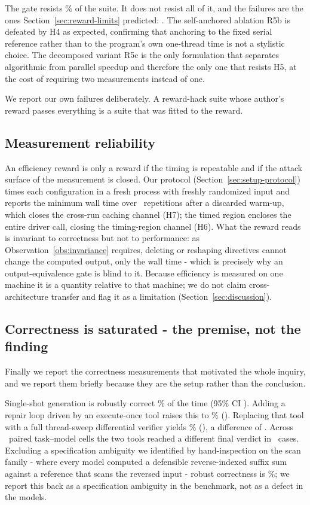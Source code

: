 The gate resists \HackGatePassRate\% of the suite. It does not resist all of
it, and the failures are the ones Section~\ref{sec:reward-limits} predicted:
\HackGateSurvivors. The self-anchored ablation R5b is defeated by H4 as
expected, confirming that anchoring to the fixed serial reference rather than
to the program's own one-thread time is not a stylistic choice. The decomposed
variant R5c is the only formulation that separates algorithmic from parallel
speedup and therefore the only one that resists H5, at the cost of requiring
two measurements instead of one.

We report our own failures deliberately. A reward-hack suite whose author's
reward passes everything is a suite that was fitted to the reward.

\subsection{Measurement reliability}
\label{sec:results-robust}

An efficiency reward is only a reward if the timing is repeatable and if the
attack surface of the measurement is closed. Our protocol
(Section~\ref{sec:setup-protocol}) times each configuration in a fresh process
with freshly randomized input and reports the minimum wall time over \NRepeats\
repetitions after a discarded warm-up, which closes the cross-run caching
channel (H7); the timed region encloses the entire driver call, closing the
timing-region channel (H6). What the reward reads is invariant to correctness
but not to performance: as Observation~\ref{obs:invariance} requires, deleting or
reshaping directives cannot change the computed output, only the wall
time - which is precisely why an output-equivalence gate is blind to it. Because
efficiency is measured on one machine it is a quantity relative to that machine;
we do not claim cross-architecture transfer and flag it as a limitation
(Section~\ref{sec:discussion}).

\subsection{Correctness is saturated - the premise, not the finding}
\label{sec:results-saturation}

Finally we report the correctness measurements that motivated the whole
inquiry, and we report them briefly because they are the setup rather than the
conclusion.

Single-shot generation is robustly correct \RobustL\% of the time
(95\% CI \CIL). Adding a repair loop driven by an execute-once tool raises this
to \RobustLone\% (\CILone). Replacing that tool with a full thread-sweep
differential verifier yields \RobustLtwo\% (\CILtwo), a difference of
\RobustDelta. Across \PairedCells\ paired task--model cells the two tools
reached a different final verdict in \PairedDisagree\ cases. Excluding a
specification ambiguity we identified by hand-inspection on the scan
family - where every model computed a defensible reverse-indexed suffix sum
against a reference that scans the reversed input - robust correctness is
\RobustExclScan\%; we report this back as a specification ambiguity in the
benchmark, not as a defect in the models.

